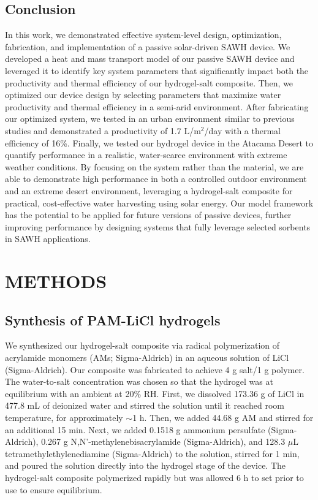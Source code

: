 \documentclass[11pt]{article}
\begin{document}
\subsection{Conclusion}

In this work, we demonstrated effective system-level design, optimization, fabrication, and implementation of a passive solar-driven SAWH device. We developed a heat and mass transport model of our passive SAWH device and leveraged it to identify key system parameters that significantly impact both the productivity and thermal efficiency of our hydrogel-salt composite. Then, we optimized our device design by selecting parameters that maximize water productivity and thermal efficiency in a semi-arid environment. After fabricating our optimized system, we tested in an urban environment similar to previous studies and demonstrated a productivity of 1.7 L/m$^{2}$/day with a thermal efficiency of 16\%. Finally, we tested our hydrogel device in the Atacama Desert to quantify performance in a realistic, water-scarce environment with extreme weather conditions. By focusing on the system rather than the material, we are able to demonstrate high performance in both a controlled outdoor environment and an extreme desert environment, leveraging a hydrogel-salt composite for practical, cost-effective water harvesting using solar energy. Our model framework has the potential to be applied for future versions of passive devices, further improving performance by designing systems that fully leverage selected sorbents in SAWH applications.

\section{METHODS}

\subsection{Synthesis of PAM-LiCl hydrogels}

We synthesized our hydrogel-salt composite via radical polymerization of acrylamide monomers (AMs; Sigma-Aldrich) in an aqueous solution of LiCl (Sigma-Aldrich). Our composite was fabricated to achieve 4 g salt/1 g polymer. The water-to-salt concentration was chosen so that the hydrogel was at equilibrium with an ambient at 20\% RH. First, we dissolved 173.36 g of LiCl in 477.8 mL of deionized water and stirred the solution until it reached room temperature, for approximately $\sim$1 h. Then, we added 44.68 g AM and stirred for an additional 15 min. Next, we added 0.1518 g ammonium persulfate (Sigma-Aldrich), 0.267 g N,N'-methylenebisacrylamide (Sigma-Aldrich), and 128.3 $\mu$L tetramethylethylenediamine (Sigma-Aldrich) to the solution, stirred for 1 min, and poured the solution directly into the hydrogel stage of the device. The hydrogel-salt composite polymerized rapidly but was allowed 6 h to set prior to use to ensure equilibrium.
\end{document}
